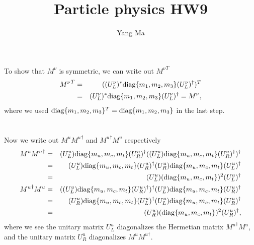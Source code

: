\documentclass[11pt]{article}
\begin{document}
\title{Particle physics HW9}
\author{Yang Ma}

\maketitle

\section{ }
To show that ${M^\nu}$ is symmetric, we can write out ${M^\nu}^T$
\begin{eqnarray}
    {M^\nu}^T &=& ((U^\nu_L)^* {\rm diag}\{m_1, m_2,  m_3 \} (U^\nu_L)^\dagger)^T \\ 
    &=& (U^\nu_L)^* {\rm diag}\{m_1, m_2,  m_3  \} (U^\nu_L)^\dagger = {M^\nu},
\end{eqnarray}
where we used ${\rm diag}\{m_1, m_2,  m_3  \} ^T ={\rm diag}\{m_1, m_2,  m_3  \} $ in the last step.

\section{ }
Now we write out $M^u {M^u}^\dagger$ and ${M^u}^\dagger M^u $ respectively
\begin{eqnarray}
    M^u {M^u}^\dagger  &=& (U^u_L) {\rm diag}\{m_u, m_c,m_t\} (U^u_R)^\dagger ((U^u_L) {\rm diag}\{m_u, m_c,m_t\} (U^u_R)^\dagger )^\dagger\\
    &=& (U^u_L) {\rm diag}\{m_u, m_c,m_t\} (U^u_R)^\dagger (U^u_R) {\rm diag}\{m_u, m_c,m_t\} (U^u_L)^\dagger \\
    &=&(U^u_L) ({\rm diag}\{m_u, m_c,m_t\})^2 (U^u_L)^\dagger \\
    {M^u}^\dagger M^u &=& ((U^u_L) {\rm diag}\{m_u, m_c,m_t\} (U^u_R)^\dagger )^\dagger (U^u_L) {\rm diag}\{m_u, m_c,m_t\} (U^u_R)^\dagger \\
    &=& (U^u_R) {\rm diag}\{m_u, m_c,m_t\} (U^u_L)^\dagger (U^u_L) {\rm diag}\{m_u, m_c,m_t\} (U^u_R)^\dagger \\
    &=& (U^u_R) ({\rm diag}\{m_u, m_c,m_t\})^2 (U^u_R)^\dagger,
\end{eqnarray}
where we see the unitary matrix $U^u_L$ diagonalizes the 
Hermetian matrix ${M^u}^\dagger M^u$, and the unitary matrix $U^u_R$ 
diagonalizes $M^u {M^u}^\dagger$.
\end{document}

